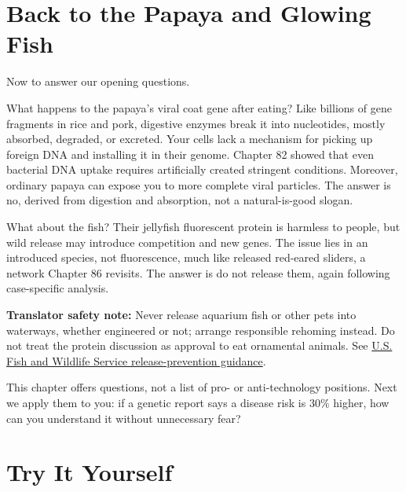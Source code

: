 \section{Back to the Papaya and Glowing Fish}

Now to answer our opening questions.

What happens to the papaya's viral coat gene after eating? Like billions of gene fragments in rice and pork, digestive enzymes break it into nucleotides, mostly absorbed, degraded, or excreted. Your cells lack a mechanism for picking up foreign DNA and installing it in their genome. Chapter 82 showed that even bacterial DNA uptake requires artificially created stringent conditions. Moreover, ordinary papaya can expose you to more complete viral particles. The answer is no, derived from digestion and absorption, not a natural-is-good slogan.

What about the fish? Their jellyfish fluorescent protein is harmless to people, but wild release may introduce competition and new genes. The issue lies in an introduced species, not fluorescence, much like released red-eared sliders, a network Chapter 86 revisits. The answer is do not release them, again following case-specific analysis.

\textbf{Translator safety note:} Never release aquarium fish or other pets into waterways, whether engineered or not; arrange responsible rehoming instead. Do not treat the protein discussion as approval to eat ornamental animals. See \href{https://www.fws.gov/story/dont-let-it-loose}{U.S. Fish and Wildlife Service release-prevention guidance}.

This chapter offers questions, not a list of pro- or anti-technology positions. Next we apply them to you: if a genetic report says a disease risk is $30\%$ higher, how can you understand it without unnecessary fear?

\section*{Try It Yourself}

